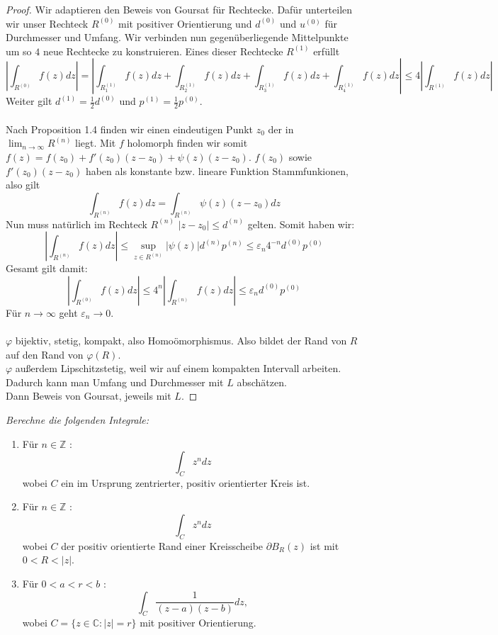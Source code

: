 \documentclass[11pt]{article}
\newenvironment{problem}[2][Beispiel]{
    \begin{trivlist}
        \item[\hskip \labelsep {\bfseries #1}\hskip \labelsep {\bfseries #2.}] \itshape}{
    \end{trivlist}\normalshape
}
\begin{document}
    \begin{proof}
        Wir adaptieren den Beweis von Goursat für Rechtecke. Dafür unterteilen wir unser Rechteck
        $R^{(0)}$ mit positiver Orientierung und $d^{(0)}$ und $u^{(0)}$ für Durchmesser und Umfang.
        Wir verbinden nun gegenüberliegende Mittelpunkte um so $4$ neue Rechtecke zu konstruieren.
        Eines dieser Rechtecke $R^{(1)}$ erfüllt
        $$\left|\int_{R^{(0)}} f(z)dz\right|=\left|\int_{R^{(1)}_1} f(z)dz+\int_{R^{(1)}_2} f(z)dz+
        \int_{R^{(1)}_3} f(z)dz+\int_{R^{(1)}_4} f(z)dz\right|\leq 4 \left|\int_{R^{(1)}} f(z)dz\right|$$
        Weiter gilt $d^{(1)} = \frac{1}{2}d^{(0)}$ und $p^{(1)}=\frac{1}{2}p^{(0)}$.\\\\
        Nach Proposition 1.4 finden wir einen eindeutigen Punkt $z_0$ der in $\lim_{n\to\infty}R^{(n)}$ liegt.
        Mit $f$ holomorph finden wir somit $f(z) = f(z_0)+f'(z_0)(z-z_0)+\psi(z)(z-z_0)$. $f(z_0)$ sowie
        $f'(z_0)(z-z_0)$ haben als konstante bzw. lineare Funktion Stammfunkionen, also gilt
        $$\int_{R^{(n)}} f(z)dz = \int_{R^{(n)}}\psi(z)(z-z_0)dz$$
        Nun muss natürlich im Rechteck $R^{(n)}$ $|z-z_0|\leq d^{(n)}$ gelten. Somit haben wir:
        $$\left|\int_{R^{(n)}} f(z)dz\right|\leq \sup_{z\in R^{(n)}}|\psi(z)| d^{(n)}p^{(n)} \leq \varepsilon_n 4^{-n}
        d^{(0)}p^{(0)}$$
        Gesamt gilt damit:
        $$\left|\int_{R^{(0)}} f(z)dz\right|\leq 4^n\left|\int_{R^{(n)}} f(z)dz\right|\leq \varepsilon_n d^{(0)}p^{(0)}$$
        Für $n\to\infty$ geht $\varepsilon_n\to 0$.\\\\
        $\varphi$ bijektiv, stetig, kompakt, also Homoömorphismus. Also bildet
        der Rand von $R$ auf den Rand von $\varphi(R)$. \\
        $\varphi$ außerdem Lipschitzstetig, weil wir auf einem kompakten Intervall
        arbeiten. Dadurch kann man Umfang und Durchmesser mit $L$ abschätzen. \\
        Dann Beweis von Goursat, jeweils mit $L$.
    \end{proof}

    \begin{problem}{4}
        Berechne die folgenden Integrale:
        \begin{enumerate}[label = (\alph*)]
            \item Für $n \in \mathbb{Z}$ :
            $$
            \int_C z^n d z
            $$
            wobei $C$ ein im Ursprung zentrierter, positiv orientierter Kreis ist.
            \item Für $n \in \mathbb{Z}$ :
            $$
            \int_C z^n d z
            $$
            wobei $C$ der positiv orientierte Rand einer Kreisscheibe $\partial B_R(z)$ ist mit $0<R<|z|$.
            \item Für $0<a<r<b$ :
            $$
            \int_C \frac{1}{(z-a)(z-b)} d z,
            $$
            wobei $C=\{z \in \mathbb{C}:|z|=r\}$ mit positiver Orientierung.
        \end{enumerate}
    \end{problem}
\end{document}

